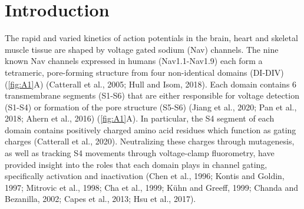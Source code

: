 \section{Introduction}
The rapid and varied kinetics of action potentials in the brain, heart and skeletal muscle tissue are shaped by voltage gated sodium (Nav) channels. The nine known Nav channels expressed in humans (Nav1.1-Nav1.9) each form a tetrameric, pore-forming structure from four non-identical domains (DI-DIV) (\autoref{fig:A1}A) (Catterall et al., 2005; Hull and Isom, 2018). Each domain contains 6 transmembrane segments (S1-S6) that are either responsible for voltage detection (S1-S4) or formation of the pore structure (S5-S6) (Jiang et al., 2020; Pan et al., 2018; Ahern et al., 2016) (\autoref{fig:A1}A). In particular, the S4 segment of each domain contains positively charged amino acid residues which function as gating charges (Catterall et al., 2020). Neutralizing these charges through mutagenesis, as well as tracking S4 movements through voltage-clamp fluorometry, have provided insight into the roles that each domain plays in channel gating, specifically activation and inactivation (Chen et al., 1996; Kontis and Goldin, 1997; Mitrovic et al., 1998; Cha et al., 1999; Kühn and Greeff, 1999; Chanda and Bezanilla, 2002; Capes et al., 2013; Hsu et al., 2017).

